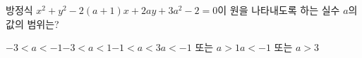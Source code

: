 방정식 $x^2+y^2-2(a+1)x+2ay+3a^2-2=0$이 원을 나타내도록 하는 실수 $a$의 값의 범위는?
\begin{choicesii}{$-3<a<-1$}{$-3<a<1$}{$-1<a<3$}{$a<-1$ 또는 $a>1$}{$a<-1$ 또는 $a>3$}\end{choicesii}
